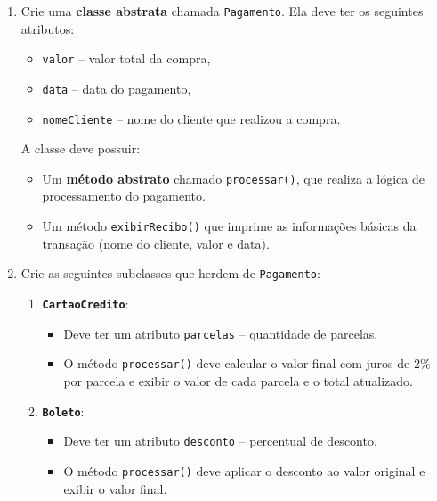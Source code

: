 \documentclass{article}
\begin{document}
\begin{enumerate}
    \item Crie uma \textbf{classe abstrata} chamada \texttt{Pagamento}.
          Ela deve ter os seguintes atributos:
          \begin{itemize}
              \item \texttt{valor} -- valor total da compra,
              \item \texttt{data} -- data do pagamento,
              \item \texttt{nomeCliente} -- nome do cliente que realizou a compra.
          \end{itemize}

          A classe deve possuir:
          \begin{itemize}
              \item Um \textbf{método abstrato} chamado \texttt{processar()}, que realiza a lógica de processamento do pagamento.
              \item Um método \texttt{exibirRecibo()} que imprime as informações básicas da transação (nome do cliente, valor e data).
          \end{itemize}

    \item Crie as seguintes subclasses que herdem de \texttt{Pagamento}:
          \begin{enumerate}
              \item \textbf{\texttt{CartaoCredito}}:
                    \begin{itemize}
                        \item Deve ter um atributo \texttt{parcelas} -- quantidade de parcelas.
                        \item O método \texttt{processar()} deve calcular o valor final com juros de 2\% por parcela e exibir o valor de cada parcela e o total atualizado.
                    \end{itemize}

              \item \textbf{\texttt{Boleto}}:
                    \begin{itemize}
                        \item Deve ter um atributo \texttt{desconto} -- percentual de desconto.
                        \item O método \texttt{processar()} deve aplicar o desconto ao valor original e exibir o valor final.
                    \end{itemize}


\end{enumerate}
\end{enumerate}
\end{document}
